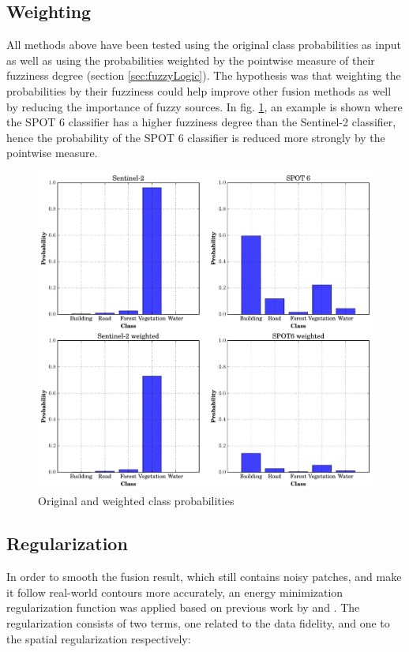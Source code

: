 \documentclass[10pt]{article}
\begin{document}
\subsection{Weighting}
All methods above have been tested using the original class probabilities as input  as well as using the probabilities weighted by the pointwise measure of their fuzziness degree (section \ref{sec:fuzzyLogic}). The hypothesis was that weighting the probabilities by their fuzziness could help improve other fusion methods as well by reducing the importance of fuzzy sources. In fig. \ref{fig:proba_point}, an example is shown where the SPOT 6 classifier has a higher fuzziness degree than the Sentinel-2 classifier, hence the probability of the SPOT 6 classifier is reduced more strongly by the pointwise measure.

\begin{figure}[H]
    \centering
    \includegraphics[width=.7\textwidth]{proba_point}
    \caption{Original and weighted class probabilities}
    \label{fig:proba_point}
\end{figure}


\subsection{Regularization}\label{sec:regularization}
In order to smooth the fusion result, which still contains noisy patches, and make it follow real-world contours more accurately, an energy minimization regularization function was applied based on previous work by \cite{hervieu_fusion_2016} and \cite{ouerghemmi_two-step_2017}. The regularization consists of two terms, one related to the data fidelity, and one to the spatial regularization respectively:
\end{document}
